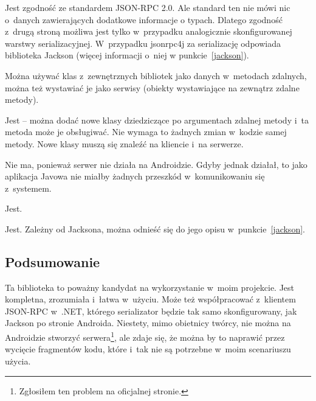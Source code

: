 \begin{description}

Jest zgodność ze standardem JSON-RPC 2.0. Ale standard ten nie mówi nic o~danych zawierających dodatkowe informacje o typach.
Dlatego zgodność z~drugą stroną możliwa jest tylko w~przypadku analogicznie skonfigurowanej warstwy serializacyjnej. W~przypadku jsonrpc4j za serializację odpowiada biblioteka Jackson (więcej informacji o~niej w punkcie~\ref{jackson}).

Można używać klas z~zewnętrznych bibliotek jako danych w~metodach zdalnych, można też wystawiać je jako serwisy (obiekty wystawiające na zewnątrz zdalne metody).

Jest -- można dodać nowe klasy dziedziczące po argumentach zdalnej metody i~ta metoda może je obsługiwać. Nie wymaga to żadnych zmian w~kodzie samej metody. Nowe klasy muszą się znaleźć na kliencie i~na serwerze.

Nie ma, ponieważ serwer nie działa na Androidzie. Gdyby jednak działał, to jako aplikacja Javowa nie miałby żadnych przeszkód w~komunikowaniu się z~systemem.

Jest.

Jest. Zależny od Jacksona, można odnieść się do jego opisu w~punkcie~\ref{jackson}.
\end{description}

\subsection{Podsumowanie}
Ta biblioteka to poważny kandydat na wykorzystanie w~moim projekcie.
Jest kompletna, zrozumiała i~łatwa w~użyciu.
Może też współpracować z~klientem JSON-RPC w~.NET, którego serializator będzie tak samo skonfigurowany, jak Jackson po stronie Androida.
Niestety, mimo obietnicy twórcy, nie można na Androidzie stworzyć serwera\footnote{Zgłosiłem ten problem na oficjalnej stronie.}, ale zdaje się, że można by to naprawić przez wycięcie fragmentów kodu, które i~tak nie są potrzebne w~moim scenariuszu użycia.


